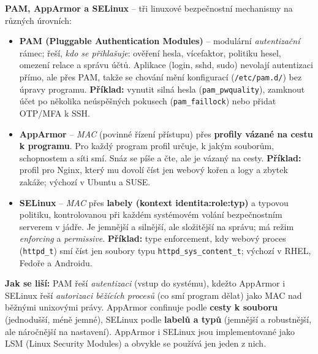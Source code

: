 \begin{notebox}
\textbf{PAM, AppArmor a SELinux} -- tři linuxové bezpečnostní mechanismy na různých úrovních:
\begin{itemize}
  \item \textbf{PAM (Pluggable Authentication Modules)} -- modulární \emph{autentizační} rámec; řeší, \emph{kdo se přihlašuje}: ověření hesla, vícefaktor, politiku hesel, omezení relace a správu účtů. Aplikace (login, sshd, sudo) nevolají autentizaci přímo, ale přes PAM, takže se chování mění konfigurací (\texttt{/etc/pam.d/}) bez úpravy programu. \textbf{Příklad:} vynutit silná hesla (\texttt{pam\_pwquality}), zamknout účet po několika neúspěšných pokusech (\texttt{pam\_faillock}) nebo přidat OTP/MFA k SSH.
  \item \textbf{AppArmor} -- \emph{MAC} (povinné řízení přístupu) přes \textbf{profily vázané na cestu k programu}. Pro každý program profil určuje, k jakým souborům, schopnostem a síti smí. Snáz se píše a čte, ale je vázaný na cesty. \textbf{Příklad:} profil pro Nginx, který mu dovolí číst jen webový kořen a logy a zbytek zakáže; výchozí v Ubuntu a SUSE.
  \item \textbf{SELinux} -- \emph{MAC} přes \textbf{labely (kontext identita:role:typ)} a typovou politiku, kontrolovanou při každém systémovém volání bezpečnostním serverem v jádře. Je jemnější a silnější, ale složitější na správu; má režim \emph{enforcing} a \emph{permissive}. \textbf{Příklad:} type enforcement, kdy webový proces (\texttt{httpd\_t}) smí číst jen soubory typu \texttt{httpd\_sys\_content\_t}; výchozí v RHEL, Fedoře a Androidu.
\end{itemize}
\textbf{Jak se liší:} PAM řeší \emph{autentizaci} (vstup do systému), kdežto AppArmor i SELinux řeší \emph{autorizaci běžících procesů} (co smí program dělat) jako MAC nad běžnými unixovými právy. AppArmor confinuje podle \textbf{cesty k souboru} (jednodušší, méně jemné), SELinux podle \textbf{labelů a typů} (jemnější a robustnější, ale náročnější na nastavení). AppArmor i SELinux jsou implementované jako LSM (Linux Security Modules) a obvykle se používá jen jeden z nich.
\end{notebox}

